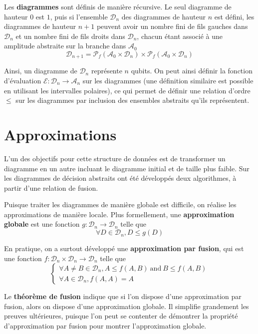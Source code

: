Les \textbf{diagrammes} sont définis de manière récursive. Le seul diagramme de hauteur 0 est $\boxed 1$, puis si l'ensemble $\mathcal D_n$ des diagrammes de hauteur $n$ est défini, les diagrammes de hauteur $n+1$ peuvent avoir un nombre fini de fils gauches dans $\mathcal D_n$ et un nombre fini de fils droits dans $\mathcal D_n$, chacun étant associé à une amplitude abstraite sur la branche dans $\mathcal A_0$
$$\mathcal{D}_{n+1} = \mathscr{P}_f(\mathcal{A}_0 \times \mathcal{D}_n) \times \mathscr{P}_f(\mathcal{A}_0 \times \mathcal{D}_n)$$

Ainsi, un diagramme de $\mathcal D_n$ représente $n$ qubits.
On peut ainsi définir la fonction d'évaluation $\mathcal E : \mathcal D_n \to \mathcal A_n$ sur les diagrammes (une définition similaire est possible en utilisant les intervalles polaires), ce qui permet de définir une relation d'ordre $\le$ sur les diagrammes par inclusion des ensembles abstraits qu'ils représentent.

\section{Approximations}

L'un des objectifs pour cette structure de données est de transformer un diagramme en un autre incluant le diagramme initial et de taille plus faible. Sur les diagrammes de décision abstraits ont été développés deux algorithmes, à partir d'une relation de fusion.

Puisque traiter les diagrammes de manière globale est difficile, on réalise les approximations de manière locale. Plus formellement, une \textbf{approximation globale} est une fonction $g : \mathcal D_n \to \mathcal D_n$ telle que
$$\forall D \in \mathcal D_n, D \le g(D)$$

En pratique, on a surtout développé une \textbf{approximation par fusion}, qui est une fonction $f : \mathcal D_n \times \mathcal D_n \rightarrow \mathcal D_n$ telle que
$$\begin{cases}
  \forall A \not= B \in \mathcal{D}_n, A \le f(A, B)~\text{and}~B \le f(A, B) \\
  \forall A \in \mathcal{D}_n, f(A, A) = A
\end{cases}
$$

Le \textbf{théorème de fusion} indique que si l'on dispose d'une approximation par fusion, alors on dispose d'une approximation globale. Il simplifie grandement les preuves ultérieures, puisque l'on peut se contenter de démontrer la propriété d'approximation par fusion pour montrer l'approximation globale.

